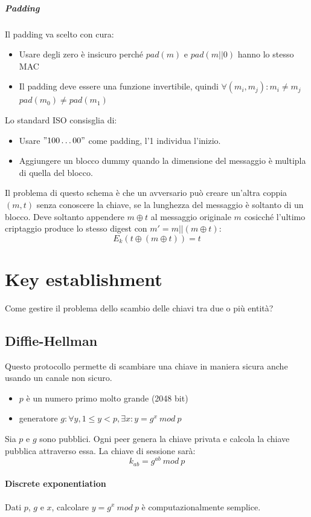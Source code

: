 \documentclass[a4paper,12pt]{article}
\begin{document}
\subparagraph{Padding} Il padding va scelto con cura:
\begin{itemize}
	\item Usare degli zero è insicuro perché $pad(m)$ e $pad(m||0)$ hanno lo stesso MAC 
	\item Il padding deve essere una funzione invertibile, quindi $\forall(m_i,m_j) : m_i \neq m_j$ \\ $pad(m_0) \neq pad(m_1)$
\end{itemize}
Lo standard ISO consisglia di:
\begin{itemize}
	\item Usare $"100\ldots00"$ come padding, l'1 individua l'inizio.
	\item Aggiungere un blocco dummy quando la dimensione del messaggio è multipla di quella del blocco.
\end{itemize}
Il problema di questo schema è che un avversario può creare un'altra coppia $(m,t)$ senza conoscere la chiave, se la lunghezza del messaggio è soltanto di un blocco.
Deve soltanto appendere $m \oplus t$ al messaggio originale $m$ cosicché l'ultimo criptaggio produce lo stesso digest con $m' = m||(m \oplus t)$:
$$ E_k(t \oplus (m \oplus t)) = t $$

\newpage

\section{Key establishment}
Come gestire il problema dello scambio delle chiavi tra due o più entità?
\subsection{Diffie-Hellman}
Questo protocollo permette di scambiare una chiave in maniera sicura anche usando un canale non sicuro.
\begin{itemize}
	\item $p$ è un numero primo molto grande (2048 bit)
	\item generatore $g : \forall y, 1 \leq y < p, \exists x : y = g^x\ mod\ p$
\end{itemize}
Sia $p$ e $g$ sono pubblici. Ogni peer genera la chiave privata e calcola la chiave pubblica attraverso essa. La chiave di sessione sarà:
$$ k_{ab} = g^{ab}\ mod\ p $$

\paragraph{Discrete exponentiation} Dati $p$, $g$ e $x$, calcolare $y = g^x\ mod\ p$ è computazionalmente semplice.
\end{document}
